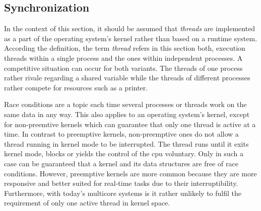 \subsection{Synchronization}\label{sec:synchro}

In the context of this section, it should be assumed that \textit{threads} are implemented as a part of the operating system's kernel rather than based on a runtime system.
According the definition, the term \textit{thread} refers in this section both, execution threads within a single process and the ones within independent processes.
A competitive situation can occur for both variants. 
The threads of one process rather rivale regarding a shared variable while the threads of different processes rather compete for resources such as a printer.

Race conditions are a topic each time several processes or threads work on the same data in any way.
This also applies to an operating system's kernel, except for non-preemtive kernels which can guarantee that only one thread is active at a time\cite{silberschatz2009operating}.
In contrast to preemptive kernels, non-preemptive ones do not allow a thread running in kernel mode to be interrupted. 
The thread runs until it exits kernel mode, blocks or yields the control of the \ac{cpu} voluntary\cite{silberschatz2009operating}.
Only in such a case can be guaranteed that a kernel and its data structures are free of race conditions.
However, preemptive kernels are more common because they are more responsive and better suited for real-time tasks due to their interruptibility\cite{silberschatz2009operating}.
Furthermore, with today's multicore systems is it rather unlikely to fulfil the requirement of only one active thread in kernel space.

